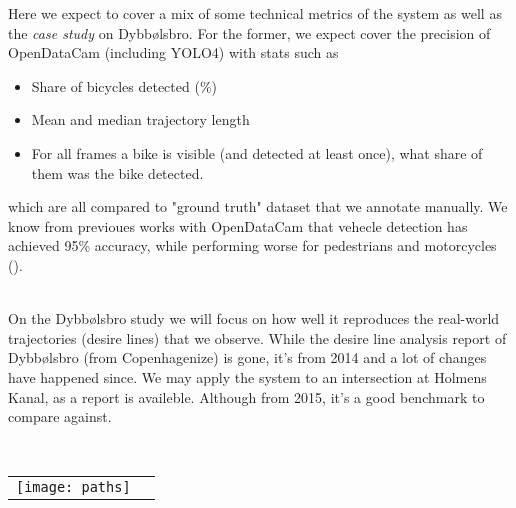Here we expect to cover a mix of some technical metrics of the system as well as the \textit{case study} on Dybbølsbro. 
For the former, we expect cover the precision of OpenDataCam (including YOLO4) with stats such as

\begin{itemize}
	\item Share of bicycles detected (\%)
	\item Mean and median trajectory length
	\item For all frames a bike is visible (and detected at least once), what share of them was the bike detected.
\end{itemize}

which are all compared to "ground truth" dataset that we annotate manually. We know from previoues works with OpenDataCam
that vehecle detection has achieved 95\% accuracy, while performing worse for pedestrians and motorcycles (\cite{BROEKMAN2021100068}).

\ \\
On the Dybbølsbro study we will focus on how well it reproduces the real-world trajectories (desire lines) that
we observe. While the desire line analysis report of Dybbølsbro (from Copenhagenize) is gone, it's from 2014 and a lot of changes have happened since.
We may apply the system to an intersection at Holmens Kanal, as a report is availeble. Although from 2015, it's a good benchmark to compare against. 


\raggedbottom
\ \\ 
\noindent
\begin{tabular}{@{}cc}
\texttt{[image: paths]} 
\end{tabular}
